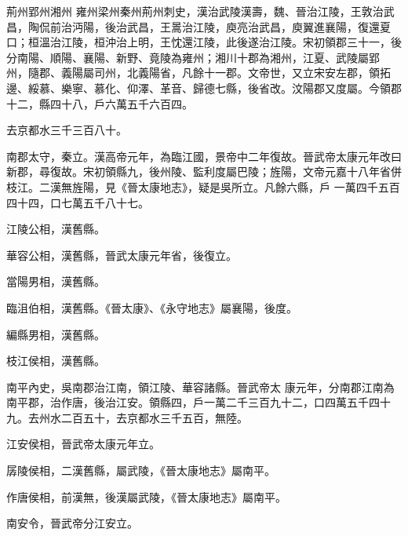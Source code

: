 
\begin{pinyinscope}

 荊州郢州湘州
 雍州梁州秦州荊州刺史，漢治武陵漢壽，魏、晉治江陵，王敦治武昌，陶侃前治沔陽，後治武昌，王暠治江陵，庾亮治武昌，庾翼進襄陽，復還夏口；桓溫治江陵，桓沖治上明，王忱還江陵，此後遂治江陵。宋初領郡三十一，後分南陽、順陽、襄陽、新野、竟陵為雍州；湘川十郡為湘州，江夏、武陵屬郢
 州，隨郡、義陽屬司州，北義陽省，凡餘十一郡。文帝世，又立宋安左郡，領拓邊、綏慕、樂寧、慕化、仰澤、革音、歸德七縣，後省改。汶陽郡又度屬。今領郡十二，縣四十八，戶六萬五千六百四。



 去京都水三千三百八十。



 南郡太守，秦立。漢高帝元年，為臨江國，景帝中二年復故。晉武帝太康元年改曰新郡，尋復故。宋初領縣九，後州陵、監利度屬巴陵；旌陽，文帝元嘉十八年省併枝江。二漢無旌陽，見《晉太康地志》，疑是吳所立。凡餘六縣，戶
 一萬四千五百四十四，口七萬五千八十七。



 江陵公相，漢舊縣。



 華容公相，漢舊縣，晉武太康元年省，後復立。



 當陽男相，漢舊縣。



 臨沮伯相，漢舊縣。《晉太康》、《永守地志》屬襄陽，後度。



 編縣男相，漢舊縣。



 枝江侯相，漢舊縣。



 南平內史，吳南郡治江南，領江陵、華容諸縣。晉武帝太
 康元年，分南郡江南為南平郡，治作唐，後治江安。領縣四，戶一萬二千三百九十二，口四萬五千四十九。去州水二百五十，去京都水三千五百，無陸。



 江安侯相，晉武帝太康元年立。



 孱陵侯相，二漢舊縣，屬武陵，《晉太康地志》屬南平。



 作唐侯相，前漢無，後漢屬武陵，《晉太康地志》屬南平。



 南安令，晉武帝分江安立。




\end{pinyinscope}
